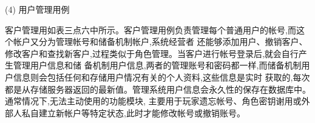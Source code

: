 \begin{center}
    \renewcommand\arraystretch{1.5}{
    }
\end{center}

(4) 用户管理用例


客户管理用如表三点六中所示。客户管理用例负责管理每个普通用户的帐号,而这个帐户又分为管理帐号和储备机制帐户,系统经营者
还能够添加用户、撤销客户、修改客户和查找新客户,过程类似于角色管理。当客户进行帐号登录后,就会自行产生管理用户信息和储
备机制用户信息,两者的管理账号和密码都一样,而储备机制用户信息则会包括任何和存储用户情况有关的个人资料,这些信息是实时
获取的,每次都是从存储服务器返回的最新值。管理系统用户信息会永久性的保存在数据库中。通常情况下,无法主动使用的功能模块,
主要用于玩家遗忘帐号、角色密钥谢用或外部人私自建立新帐户等特定状态,此时才能修改帐号或撤销账号。

